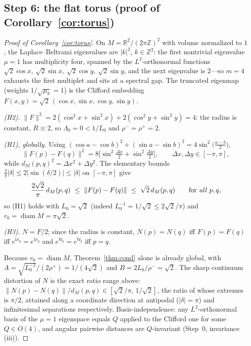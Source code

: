 \documentclass[11pt]{article}
\theoremstyle{remark}
\begin{document}
\subsection*{Step 6: the flat torus (proof of Corollary~\ref{cor:torus})}
\begin{proof}[Proof of Corollary~\ref{cor:torus}]
On $M=\mathbb{R}^2/(2\pi\mathbb{Z})^2$ with volume normalized to $1$, the
Laplace--Beltrami eigenvalues are $\lvert k\rvert^2$, $k\in\mathbb{Z}^2$: the
first nontrivial eigenvalue $\mu=1$ has multiplicity four, spanned by the
$L^2$-orthonormal functions $\sqrt2\cos x,\ \sqrt2\sin x,\ \sqrt2\cos y,\
\sqrt2\sin y$, and the next eigenvalue is $2$---so $m=4$ exhausts the first
multiplet and sits at a spectral gap. The truncated eigenmap (weights
$1/\sqrt{\mu_k}=1$) is the Clifford embedding
$F(x,y)=\sqrt2\,(\cos x,\sin x,\cos y,\sin y)$.

\emph{(H2).} $\lVert F\rVert^2=2(\cos^2x+\sin^2x)+2(\cos^2y+\sin^2y)=4$:
the radius is constant, $R\equiv2$, so $\Lambda_0=0<1/L_0$ and
$\rho^-=\rho^+=2$.

\emph{(H1), globally.} Using
$(\cos a-\cos b)^2+(\sin a-\sin b)^2=4\sin^2\!\big(\tfrac{a-b}2\big)$,
\[
\lVert F(p)-F(q)\rVert^2
=8\Big[\sin^2\tfrac{\Delta x}{2}+\sin^2\tfrac{\Delta y}{2}\Big],
\qquad \Delta x,\Delta y\in[-\pi,\pi],
\]
while $d_M(p,q)^2=\Delta x^2+\Delta y^2$. The elementary bounds
$\tfrac{2}{\pi}\lvert\delta\rvert\le2\lvert\sin(\delta/2)\rvert\le
\lvert\delta\rvert$ on $[-\pi,\pi]$ give
\[
\frac{2\sqrt2}{\pi}\,d_M(p,q)\ \le\ \lVert F(p)-F(q)\rVert\ \le\ \sqrt2\,d_M(p,q)
\qquad\text{for \emph{all} } p,q,
\]
so (H1) holds with $L_0=\sqrt2$ (indeed $L_0^{-1}=1/\sqrt2\le2\sqrt2/\pi$) and
$r_0=\operatorname{diam}M=\pi\sqrt2$.

\emph{(H3).} $N=F/2$; since the radius is constant, $N(p)=N(q)$ iff $F(p)=F(q)$
iff $e^{\mathrm i x_p}=e^{\mathrm i x_q}$ and
$e^{\mathrm i y_p}=e^{\mathrm i y_q}$ iff $p=q$.

Because $r_0=\operatorname{diam}M$, Theorem~\ref{thm:cond} alone is already
global, with $A=\sqrt{L_0^{-2}}/(2\rho^+)=1/(4\sqrt2)$ and
$B=2L_0/\rho^-=\sqrt2$. The sharp continuum distortion of $N$ is the exact
ratio range above: $\lVert N(p)-N(q)\rVert/d_M(p,q)\in[\sqrt2/\pi,\,1/\sqrt2]$,
the ratio of whose extremes is $\pi/2$, attained along a coordinate direction at
antipodal ($\lvert\delta\rvert=\pi$) and infinitesimal separations
respectively. Basis-independence: any $L^2$-orthonormal basis of the $\mu=1$
eigenspace equals $Q$ applied to the Clifford one for some $Q\in O(4)$, and
angular pairwise distances are $Q$-invariant (Step~0, invariance (iii)).
\end{proof}
\end{document}
